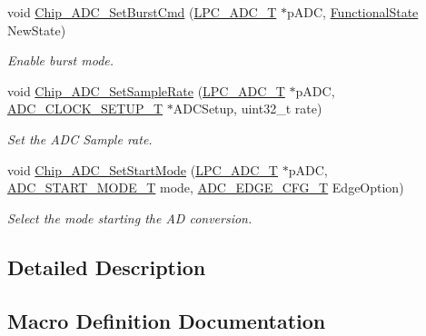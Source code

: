\begin{DoxyCompactItemize}
void \hyperlink{group__ADC__17XX__40XX_gaa9890ccee17bea824b2af26e5bb2f1d6}{Chip\+\_\+\+A\+D\+C\+\_\+\+Set\+Burst\+Cmd} (\hyperlink{structLPC__ADC__T}{L\+P\+C\+\_\+\+A\+D\+C\+\_\+T} $\ast$p\+A\+DC, \hyperlink{group__LPC__Types__Public__Types_gac9a7e9a35d2513ec15c3b537aaa4fba1}{Functional\+State} New\+State)
\begin{DoxyCompactList}\small\item\em Enable burst mode. \end{DoxyCompactList}\item 
void \hyperlink{group__ADC__17XX__40XX_gae1629ea72c61a224e69e55f7699b7810}{Chip\+\_\+\+A\+D\+C\+\_\+\+Set\+Sample\+Rate} (\hyperlink{structLPC__ADC__T}{L\+P\+C\+\_\+\+A\+D\+C\+\_\+T} $\ast$p\+A\+DC, \hyperlink{structADC__CLOCK__SETUP__T}{A\+D\+C\+\_\+\+C\+L\+O\+C\+K\+\_\+\+S\+E\+T\+U\+P\+\_\+T} $\ast$A\+D\+C\+Setup, uint32\+\_\+t rate)
\begin{DoxyCompactList}\small\item\em Set the A\+DC Sample rate. \end{DoxyCompactList}\item 
void \hyperlink{group__ADC__17XX__40XX_ga951b5b680e4d3be64c83fc6e1caf644d}{Chip\+\_\+\+A\+D\+C\+\_\+\+Set\+Start\+Mode} (\hyperlink{structLPC__ADC__T}{L\+P\+C\+\_\+\+A\+D\+C\+\_\+T} $\ast$p\+A\+DC, \hyperlink{group__ADC__17XX__40XX_ga68aae5a89b4dabc910e457a00e57ea8c}{A\+D\+C\+\_\+\+S\+T\+A\+R\+T\+\_\+\+M\+O\+D\+E\+\_\+T} mode, \hyperlink{group__ADC__17XX__40XX_ga18d12879b004e16af3b47467a2d81d56}{A\+D\+C\+\_\+\+E\+D\+G\+E\+\_\+\+C\+F\+G\+\_\+T} Edge\+Option)
\begin{DoxyCompactList}\small\item\em Select the mode starting the AD conversion. \end{DoxyCompactList}\end{DoxyCompactItemize}


\subsection{Detailed Description}


\subsection{Macro Definition Documentation}
